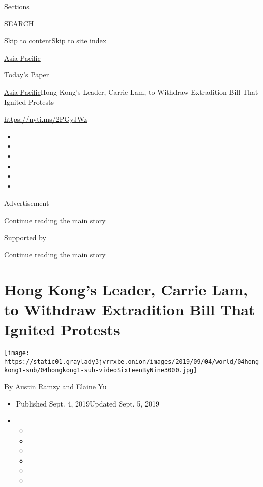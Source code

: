 Sections

SEARCH

\protect\hyperlink{site-content}{Skip to
content}\protect\hyperlink{site-index}{Skip to site index}

\href{https://www.nytimes3xbfgragh.onion/section/world/asia}{Asia
Pacific}

\href{https://myaccount.nytimes3xbfgragh.onion/auth/login?response_type=cookie\&client_id=vi}{}

\href{https://www.nytimes3xbfgragh.onion/section/todayspaper}{Today's
Paper}

\href{/section/world/asia}{Asia Pacific}\textbar{}Hong Kong's Leader,
Carrie Lam, to Withdraw Extradition Bill That Ignited Protests

\url{https://nyti.ms/2PGyJWz}

\begin{itemize}
\item
\item
\item
\item
\item
\item
\end{itemize}

Advertisement

\protect\hyperlink{after-top}{Continue reading the main story}

Supported by

\protect\hyperlink{after-sponsor}{Continue reading the main story}

\hypertarget{hong-kongs-leader-carrie-lam-to-withdraw-extradition-bill-that-ignited-protests}{%
\section{Hong Kong's Leader, Carrie Lam, to Withdraw Extradition Bill
That Ignited
Protests}\label{hong-kongs-leader-carrie-lam-to-withdraw-extradition-bill-that-ignited-protests}}

\texttt{[image: https://static01.graylady3jvrrxbe.onion/images/2019/09/04/world/04hongkong1-sub/04hongkong1-sub-videoSixteenByNine3000.jpg]}

By \href{https://www.nytimes3xbfgragh.onion/by/austin-ramzy}{Austin
Ramzy} and Elaine Yu

\begin{itemize}
\item
  Published Sept. 4, 2019Updated Sept. 5, 2019
\item
  \begin{itemize}
  \item
  \item
  \item
  \item
  \item
  \item
  \end{itemize}
\end{itemize}

